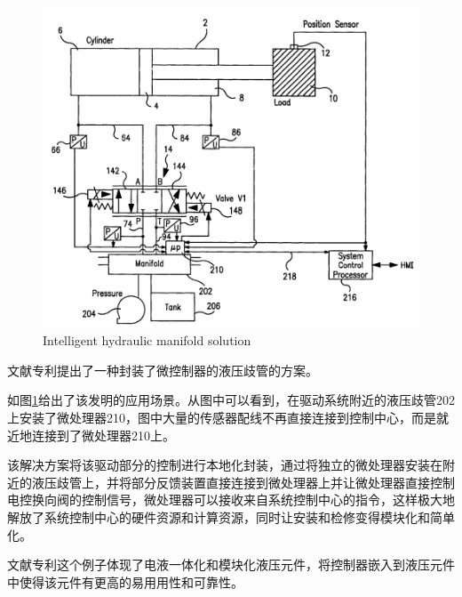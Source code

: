 \begin{figure}[!htp]
	\centering
	\includegraphics[width=\textwidth]{IMG/manifoldsubsys.png}
		{Intelligent hydraulic manifold solution}
	\label{fig:manifoldsubsys}
\end{figure}

文献\parencite{US6289259B1}专利提出了一种封装了微控制器的液压歧管的方案。

如图\ref{fig:manifoldsubsys}给出了该发明的应用场景。从图中可以看到，在驱动系统附近的液压歧管202上安装了微处理器210，图中大量的传感器配线不再直接连接到控制中心，而是就近地连接到了微处理器210上。

该解决方案将该驱动部分的控制进行本地化封装，通过将独立的微处理器安装在附近的液压歧管上，并将部分反馈装置直接连接到微处理器上并让微处理器直接控制电控换向阀的控制信号，微处理器可以接收来自系统控制中心的指令，这样极大地解放了系统控制中心的硬件资源和计算资源，同时让安装和检修变得模块化和简单化。

文献\parencite{US6289259B1}专利这个例子体现了电液一体化和模块化液压元件，将控制器嵌入到液压元件中使得该元件有更高的易用用性和可靠性。
